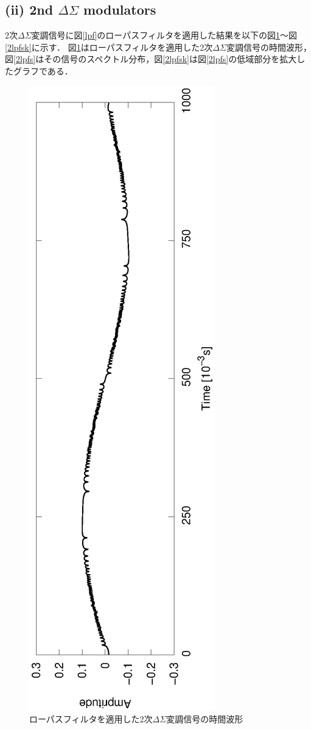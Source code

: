 \documentclass[a4j]{jsarticle}
\begin{document}
%
\subsection*{(ii) 2nd $\Delta\Sigma$ modulators}
2次$\Delta\Sigma$変調信号に図\ref{lpf}のローパスフィルタを適用した結果を以下の図\ref{2lpft}〜図\ref{2lpfsk}に示す．
図\ref{2lpft}はローパスフィルタを適用した2次$\Delta\Sigma$変調信号の時間波形，図\ref{2lpfs}はその信号のスペクトル分布，図\ref{2lpfsk}は図\ref{2lpfs}の低域部分を拡大したグラフである．
\begin{figure}[H]
 \centering
 \vspace{-3.5cm}
 \hspace{-2cm}
 \includegraphics[angle=-90,scale=0.6]{2ndout_LPF_time.eps}
 \vspace{-2cm}
 \caption{ローパスフィルタを適用した2次$\Delta\Sigma$変調信号の時間波形}
 \label{2lpft}
\end{figure}
\end{document}
